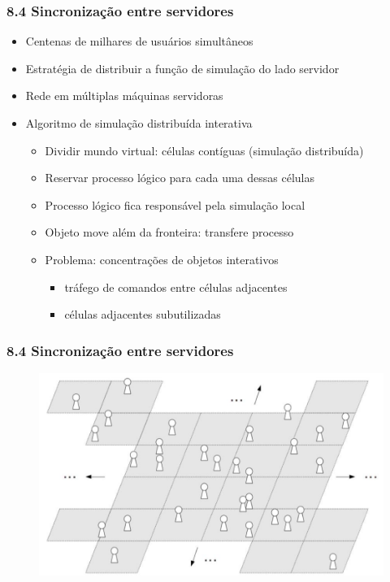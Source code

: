 \documentclass{beamer}
\begin{document}
\begin{frame}
  \frametitle{8.4 Sincronização entre servidores}
  \begin{itemize}
    \item Centenas de milhares de usuários simultâneos
    \item Estratégia de distribuir a função de simulação do lado servidor
    \item Rede em múltiplas máquinas servidoras
    \item Algoritmo de simulação distribuída interativa
    \begin{itemize}
      \item Dividir mundo virtual: células contíguas (simulação distribuída)
      \item Reservar processo lógico para cada uma dessas células
      \item Processo lógico fica responsável pela simulação local
      \item Objeto move além da fronteira: transfere processo
      \item Problema: concentrações de objetos interativos
      \begin{itemize}
        \item tráfego de comandos entre células  adjacentes
        \item células adjacentes subutilizadas
      \end{itemize}
    \end{itemize}
  \end{itemize}
\end{frame}

\begin{frame}
  \frametitle{8.4 Sincronização entre servidores}
  \begin{figure}[h]
    \centering
    \vspace{-18pt}
    \includegraphics[width=1.03\textwidth]{imagem_84.png}
    \vspace{-20pt}
  \end{figure}
\end{frame}
\end{document}
